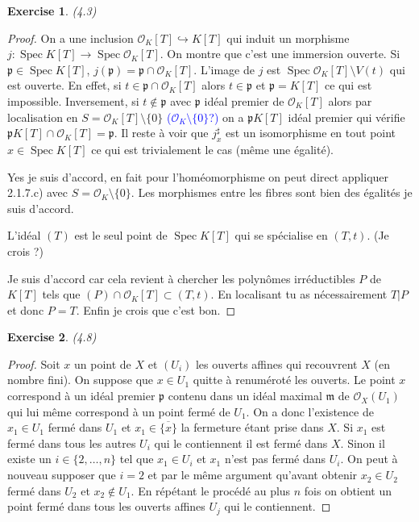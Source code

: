 \documentclass[A4, 11pt]{article}
\newtheorem{exer}{Exercise}
\def\Spec{ \operatorname{Spec}}
\begin{document}
\begin{exer}(4.3)
\end{exer}
\begin{proof}
On a une inclusion $\mathcal{O}_K[T] \hookrightarrow K[T]$ qui induit un morphisme 
$j\colon \Spec K[T] \rightarrow \Spec \mathcal{O}_K [T]$. On montre que c'est une immersion ouverte. Si $\mathfrak{p}\in \Spec K[T]$, $j(\mathfrak{p})=\mathfrak{p}\cap \mathcal{O}_K[T]$. L'image de $j$ est $\Spec \mathcal{O}_K[T] \setminus V(t)$ qui est ouverte. En effet, si $t\in \mathfrak{p}\cap \mathcal{O}_K[T]$ alors $t\in \mathfrak{p}$ et $\mathfrak{p}=K[T]$ ce qui est impossible. Inversement, si $t\notin \mathfrak{p}$ avec $\mathfrak{p}$ idéal premier de $\mathcal{O}_K[T]$ alors par localisation en $S=\mathcal{O}_K[T]\setminus \{0\}$ \textcolor{blue}{($\mathcal{O}_K\setminus \{0\}$?)} on a $\mathfrak{p}K[T]$ idéal premier qui vérifie $\mathfrak{p}K[T]\cap \mathcal{O}_K[T]=\mathfrak{p}$. Il reste à voir que $j^{\sharp}_x$ est un isomorphisme en tout point $x\in \Spec K[T]$ ce qui est trivialement le cas (même une égalité).

{\color{blue} Yes je suis d'accord, en fait pour l'homéomorphisme on peut direct appliquer 2.1.7.c) avec $S=\mathcal{O}_K\setminus \{0\}$. Les morphismes entre les fibres sont bien des égalités je suis d'accord.}

 L'idéal $(T)$ est le seul point de $\Spec K[T]$ qui se spécialise en $(T,t)$. (Je crois ?)
 
{\color{blue} Je suis d'accord car cela revient à chercher les polynômes irréductibles $P$ de $K[T]$ tels que $(P)\cap \mathcal{O}_K[T]\subset (T, t)$. En localisant tu as nécessairement $T| P$ et donc $P=T$. Enfin je crois que c'est bon.}
\end{proof}
\begin{exer}(4.8)
\end{exer}
\begin{proof}
Soit $x$ un point de $X$ et $(U_i)$ les ouverts affines qui recouvrent $X$ (en nombre fini). On suppose que $x\in U_1$ quitte à renuméroté les ouverts. Le point $x$ correspond à un idéal premier $\mathfrak{p}$ contenu dans un idéal maximal $\mathfrak{m}$ de $\mathcal{O}_X(U_1)$ qui lui même correspond à un point fermé de $U_1$. On a donc l'existence de $x_1\in U_1$ fermé dans $U_1$ et $x_1\in \overline{\{x\}}$ la fermeture étant prise dans $X$. Si $x_1$ est fermé dans tous les autres $U_i$ qui le contiennent il est fermé dans $X$. Sinon il existe un $i\in \{2,\dots , n\}$ tel que $x_1\in U_i$ et $x_1$ n'est pas fermé dans $U_i$. On peut à nouveau supposer que $i=2$ et par le même argument qu'avant obtenir $x_2\in U_2$ fermé dans $U_2$ et $x_2\notin U_1$. En répétant le procédé au plus $n$ fois on obtient un point fermé dans tous les ouverts affines $U_j$ qui le contiennent.
\end{proof}
\end{document}
